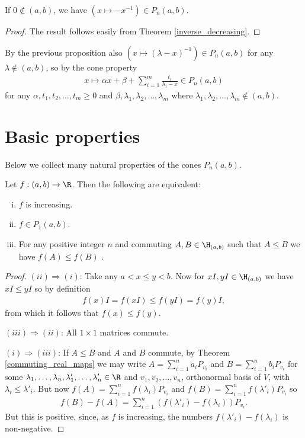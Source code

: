 \begin{prop}
	If $0 \notin (a, b)$, we have $(x \mapsto -x^{-1}) \in P_{n}(a, b)$.
\end{prop}
\begin{proof}
	The result follows easily from Theorem \ref{inverse_decreasing}.
\end{proof}

By the previous proposition also $(x \mapsto (\lambda - x)^{-1}) \in P_{n}(a, b)$ for any $\lambda \notin (a, b)$, so by the cone property
\begin{align}\label{finite_pick}
	x \mapsto \alpha x + \beta + \sum_{i = 1}^{m} \frac{t_{i}}{\lambda_{i} - x} \in P_{n}(a, b)
\end{align}
for any $\alpha, t_{1}, t_{2}, \ldots, t_{m} \geq 0$ and $\beta, \lambda_{1}, \lambda_{2}, \ldots, \lambda_{m}$ where $\lambda_{1}, \lambda_{2}, \ldots, \lambda_{m} \not\in (a, b)$.

\section{Basic properties}

Below we collect many natural properties of the cones $P_{n}(a, b)$.

\begin{prop}
	Let $f : (a, b) \to \R$. Then the following are equivalent:
	\begin{enumerate}[(i)]
		\item $f$ is increasing.
		\item $f \in P_{1}(a, b)$.
		\item For any positive integer $n$ and commuting $A, B \in \H_{(a, b)}$ such that $A \leq B$ we have $f(A) \leq f(B)$ .
	\end{enumerate}
\end{prop}
\begin{proof}
	$(ii) \Rightarrow (i)$: Take any $a < x \leq y < b$. Now for $xI, yI \in \H_{(a, b)}$ we have $x I \leq y I$ so by definition
	\begin{align*}
		f(x) I = f(xI) \leq f(y I) = f(y) I,
	\end{align*}
	from which it follows that $f(x) \leq f(y)$.

	$(iii) \Rightarrow (ii)$: All $1 \times 1$ matrices commute.
	

	$(i) \Rightarrow (iii)$: If $A \leq B$ and $A$ and $B$ commute, by Theorem \ref{commuting_real_maps} we may write $A = \sum_{i = 1}^{n} a_{i} P_{v_{i}}$ and $B = \sum_{i = 1}^{n} b_{i} P_{v_{i}}$ for some $\lambda_{1}, \ldots, \lambda_{n}, \lambda'_{1}, \ldots, \lambda'_{n} \in \R$ and $v_{1}, v_{2}, \ldots, v_{n}$, orthonormal basis of $V$, with $\lambda_{i} \leq \lambda'_{i}$. But now $f(A) = \sum_{i = 1}^{n} f(\lambda_{i}) P_{v_{i}}$ and $f(B) = \sum_{i = 1}^{n} f(\lambda'_{i}) P_{v_{i}}$ so
	\begin{align*}
		f(B) - f(A) = \sum_{i = 1}^{n} (f(\lambda'_{i}) - f(\lambda_{i})) P_{v_{i}}.
	\end{align*}
	But this is positive, since, as $f$ is increasing, the numbers $f(\lambda'_{i}) - f(\lambda_{i})$ is non-negative.
\end{proof}

